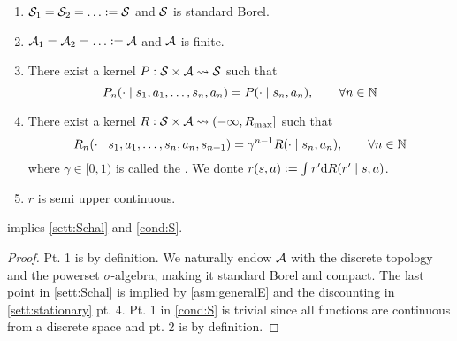 \documentclass{article}
\begin{document}
\begin{sett}
  \begin{enumerate}
    \item $\Cal{S}_1 = \Cal{S}_2 = \dots \defeq \Cal{S}$ and $\mathcal{S}$ is
      standard Borel.
    \item $\Cal{A}_1 = \Cal{A}_2 = \dots \defeq \Cal{A}$ and $\mathcal{A}$ is
      finite.
    \item There exist a kernel $P : \mathcal{S} \times \mathcal{A} \leadsto
      \mathcal{S}$ such that
      \[ P_n(\cdot \mid s_1, a_1, \dots, s_n, a_n) = P(\cdot \mid s_n, a_n),
      \qquad \forall n \in \mathbb{N} \]
    \item There exist a kernel $R : \mathcal{S} \times \mathcal{A} \leadsto
      (-\infty, R_{\max}]$
      such that
      \[ R_n(\cdot \mid s_1, a_1, \dots, s_n, a_n, s_{n+1})
	= \gamma^{n-1} R(\cdot \mid s_n, a_n),
      \qquad \forall n \in \mathbb{N} \]
      where $\gamma \in [0,1)$ is called the .
      We donte $r(s, a) \vcentcolon= \int r' \mathrm{d} R(r' \mid s, a)$.
    \item $r$ is semi upper continuous.
  \end{enumerate}
  \label{sett:stationary}
\end{sett}

\begin{prop}
   implies \cref{sett:Schal} and \cref{cond:S}.
\end{prop}
\begin{proof}
  Pt. 1 is by definition.
  We naturally endow $\mathcal{A}$ with the discrete topology
  and the powerset $\sigma$-algebra, making it
  standard Borel and compact.
  The last point in \cref{sett:Schal} is implied by
  \cref{asm:generalE} and the discounting in \cref{sett:stationary} pt. 4.
  Pt. 1 in \cref{cond:S} is trivial since all functions are
  continuous from a discrete space and pt. 2 is by definition.
\end{proof}
\end{document}
